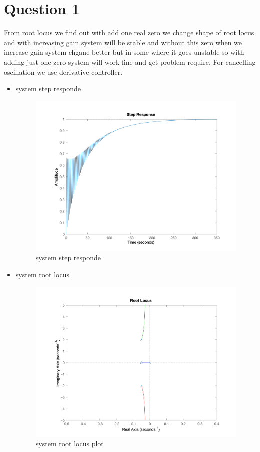 \section{Question 1}
From root locus we find out with add one real zero we change shape of root locus and with increasing gain system will be stable and without this zero when we increase gain system chgane better but in some where it goes unstable so with adding just one zero system will work fine and get problem require. For cancelling oscillation we use derivative controller.
\newpage
\begin{itemize}
    \item system step responde
    \begin{figure}[H]
        \caption{system step responde}
        \centering
        \includegraphics[width=12cm]{../Figure/Q1/Q1_system_respond.png}
    \end{figure}
    \item system root locus
    \begin{figure}[H]
        \caption{system root locus plot}
        \centering
        \includegraphics[width=12cm]{../Figure/Q1/Q1_system_rlocus.png}

\end{figure}
\end{itemize}
